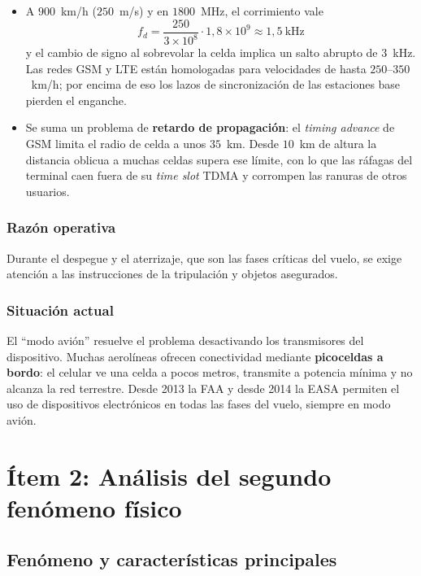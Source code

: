 \documentclass[12pt,a4paper]{article}
\begin{document}
\begin{itemize}
  \item A $900$~km/h ($250$~m/s) y en $1800$~MHz, el corrimiento vale
        \begin{equation}
          f_d = \frac{250}{3 \times 10^{8}} \cdot 1{,}8 \times 10^{9} \approx 1{,}5~\text{kHz}
        \end{equation}
        y el cambio de signo al sobrevolar la celda implica un salto abrupto de $3$~kHz.
        Las redes GSM y LTE están homologadas para velocidades de hasta
        $250$--$350$~km/h; por encima de eso los lazos de sincronización de las estaciones
        base pierden el enganche.
  \item Se suma un problema de \textbf{retardo de propagación}: el \emph{timing advance}
        de GSM limita el radio de celda a unos $35$~km. Desde $10$~km de altura la
        distancia oblicua a muchas celdas supera ese límite, con lo que las ráfagas del
        terminal caen fuera de su \emph{time slot} TDMA y corrompen las ranuras de otros
        usuarios.
\end{itemize}

\subsubsection*{Razón operativa}

Durante el despegue y el aterrizaje, que son las fases críticas del vuelo, se exige
atención a las instrucciones de la tripulación y objetos asegurados.

\subsubsection*{Situación actual}

El ``modo avión'' resuelve el problema desactivando los transmisores del dispositivo.
Muchas aerolíneas ofrecen conectividad mediante \textbf{picoceldas a bordo}: el celular ve
una celda a pocos metros, transmite a potencia mínima y no alcanza la red terrestre. Desde
2013 la FAA y desde 2014 la EASA permiten el uso de dispositivos electrónicos en todas las
fases del vuelo, siempre en modo avión.


\section{Ítem 2: Análisis del segundo fenómeno físico}

\subsection{Fenómeno y características principales}
\end{document}
